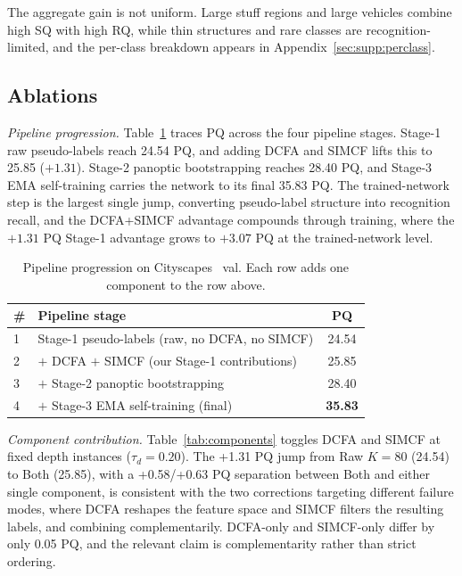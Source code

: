\documentclass{article}
\renewcommand{\paragraph}[1]{\par\smallskip\noindent\textit{#1}\hspace{0.5em}\ignorespaces}
\begin{document}
The aggregate gain is not uniform. Large stuff regions and large vehicles combine high SQ with high RQ, while thin structures and rare classes are recognition-limited, and the per-class breakdown appears in Appendix~\ref{sec:supp:perclass}.

\subsection{Ablations}
\label{sec:exp:ablations}

\paragraph{Pipeline progression.}
Table~\ref{tab:progression} traces PQ across the four pipeline stages. Stage-1 raw pseudo-labels reach 24.54 PQ, and adding DCFA and SIMCF lifts this to 25.85 ($+1.31$). Stage-2 panoptic bootstrapping reaches 28.40 PQ, and Stage-3 EMA self-training carries the network to its final 35.83 PQ. The trained-network step is the largest single jump, converting pseudo-label structure into recognition recall, and the DCFA+SIMCF advantage compounds through training, where the $+1.31$ PQ Stage-1 advantage grows to $+3.07$ PQ at the trained-network level.

\begin{table}[!htbp]
\caption{Pipeline progression on Cityscapes~\cite{cordts2016cityscapes} val. Each row adds one component to the row above.}
\label{tab:progression}
\centering
\small
\setlength{\tabcolsep}{3pt}
\begin{tabular}{l l c}
\toprule
\# & Pipeline stage & PQ \\
\midrule
1 & Stage-1 pseudo-labels (raw, no DCFA, no SIMCF) & 24.54 \\
2 & \quad $+$ DCFA $+$ SIMCF (our Stage-1 contributions) & 25.85 \\
3 & \quad $+$ Stage-2 panoptic bootstrapping & 28.40 \\
4 & \quad $+$ Stage-3 EMA self-training (final) & \textbf{35.83} \\
\bottomrule
\end{tabular}
\end{table}

\paragraph{Component contribution.}
Table~\ref{tab:components} toggles DCFA and SIMCF at fixed depth instances ($\tau_d{=}0.20$). The +1.31 PQ jump from Raw $K{=}80$ (24.54) to Both (25.85), with a +0.58/+0.63 PQ separation between Both and either single component, is consistent with the two corrections targeting different failure modes, where DCFA reshapes the feature space and SIMCF filters the resulting labels, and combining complementarily. DCFA-only and SIMCF-only differ by only 0.05 PQ, and the relevant claim is complementarity rather than strict ordering.
\end{document}
